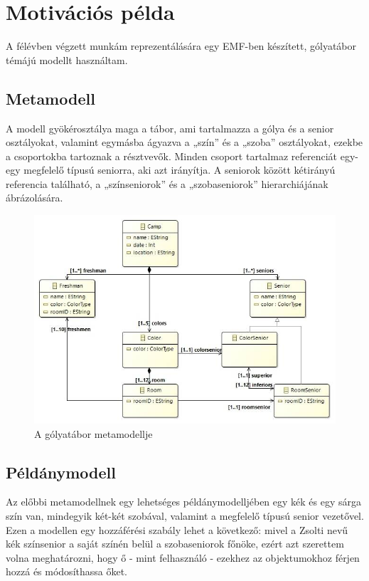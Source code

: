 \chapter{Motivációs példa}
A félévben végzett munkám reprezentálására egy EMF-ben készített, gólyatábor témájú modellt használtam.

\section{Metamodell}
A modell gyökérosztálya maga a tábor, ami tartalmazza a gólya és a senior osztályokat, valamint egymásba ágyazva a „szín” és a „szoba” osztályokat, ezekbe a csoportokba tartoznak a résztvevők. Minden csoport tartalmaz referenciát egy-egy megfelelő típusú seniorra, aki azt irányítja. A seniorok között kétirányú referencia található, a „színseniorok” és a „szobaseniorok” hierarchiájának ábrázolására.

\begin{figure}[H]
	\centering
	\includegraphics[width=150mm, keepaspectratio]{figures/metamodel.jpg}
	\caption{A gólyatábor metamodellje}
	\label{fig:metamodel}
\end{figure}


\section{Példánymodell}
Az előbbi metamodellnek egy lehetséges példánymodelljében egy kék és egy sárga szín van, mindegyik két-két szobával, valamint a megfelelő típusú senior vezetővel. Ezen a modellen egy hozzáférési szabály lehet a következő: mivel a Zsolti nevű kék színsenior a saját színén belül a szobaseniorok főnöke, ezért azt szerettem volna meghatározni, hogy ő - mint felhasználó - ezekhez az objektumokhoz férjen hozzá és módosíthassa őket.

